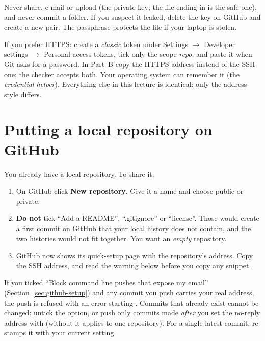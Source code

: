 \begin{pitfall}
Never share, e-mail or upload  (the private key; the file ending in  is the safe one), and never commit a  folder. If you suspect it leaked, delete the key on GitHub and create a new pair. The passphrase protects the file if your laptop is stolen.
\end{pitfall}

\begin{quickfact}
If you prefer HTTPS: create a \emph{classic} token under Settings $\rightarrow$ Developer settings $\rightarrow$ Personal access tokens, tick only the scope \emph{repo}, and paste it when Git asks for a password. In Part~B copy the HTTPS address instead of the SSH one; the checker accepts both. Your operating system can remember it (the \emph{credential helper}). Everything else in this lecture is identical: only the address style differs.
\end{quickfact}

\section{Putting a local repository on GitHub}

You already have a local repository. To share it:

\begin{enumerate}
  \item On GitHub click \textbf{New repository}. Give it a name and choose public or private.
  \item \textbf{Do not} tick ``Add a README'', ``.gitignore'' or ``license''. Those would create a first commit on GitHub that your local history does not contain, and the two histories would not fit together. You want an \emph{empty} repository.
  \item GitHub now shows its quick-setup page with the repository's address. Copy the SSH address, and read the warning below before you copy any snippet.
\end{enumerate}

\begin{pitfall}
If you ticked ``Block command line pushes that expose my email'' (Section~\ref{sec:github-setup}) and any commit you push carries your real address, the push is refused with an error starting . Commits that already exist cannot be changed: untick the option, or push only commits made \emph{after} you set the no-reply address with  (without  it applies to one repository). For a single latest commit,  re-stamps it with your current setting.
\end{pitfall}

